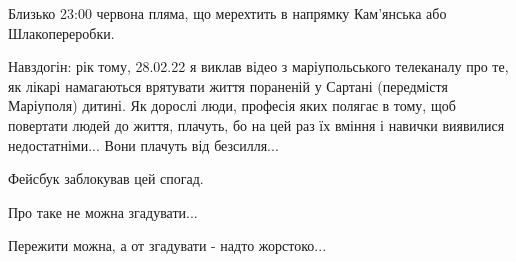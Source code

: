 Близько 23:00 червона пляма, що мерехтить в напрямку Кам'янська або Шлакопереробки.

Навздогін: рік тому, 28.02.22 я виклав  відео з маріупольського телеканалу про те, як лікарі намагаються врятувати життя пораненій у Сартані (передмістя Маріуполя) дитині. Як дорослі люди, професія яких полягає в тому, щоб повертати людей до життя, плачуть, бо на цей раз їх вміння і навички виявилися недостатніми... Вони плачуть від безсилля...

Фейсбук заблокував цей спогад. 

Про таке не можна згадувати...

Пережити можна, а от згадувати - надто жорстоко...

